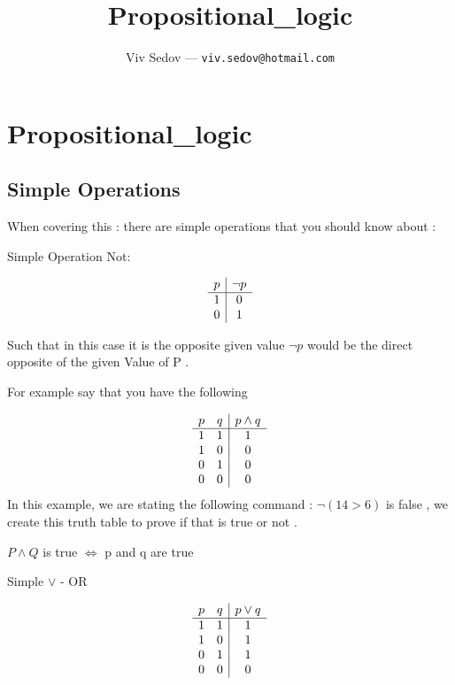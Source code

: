 \documentclass{article}
\theoremstyle{mytheoremstyle}
\theoremstyle{mytheoremstyle}
\theoremstyle{myproblemstyle}
\begin{document}
\title{
	Propositional_logic
}
\author{
	Viv Sedov --- \texttt{viv.sedov@hotmail.com}
}
\maketitle

\tableofcontents

\newpage



\section{Propositional\_logic}

\subsection{Simple Operations}
When covering this : there are simple operations that you should know about :

Simple Operation Not:

\[\begin{array}{c | c}
    p & \neg p \\
    \hline
    1 & 0 \\
    0 & 1
\end{array}
\]

Such that in this case it is the opposite given value $\neg p $ would be the direct opposite of the given Value of P .

For example say that you have the following

\[\begin{array}{c c | c}
    p & q & p \land q\\
    \hline
    1  & 1 & 1 \\
    1 & 0 & 0 \\
    0 & 1 & 0 \\
    0 & 0 & 0
\end{array}\]
In this example, we are stating the following command : $\neg(14 > 6)$ is false , we create this truth table to prove if that is true or not .

$P \land Q $ is true $\iff$ p and q are true

Simple $\lor$ - OR


\[\begin{array}{c c | c}
    p & q & p \lor q \\
    \hline
    1 & 1 & 1 \\
    1 & 0 & 1 \\
    0 & 1 & 1 \\
    0 & 0 & 0 \\
\end{array}\]
\end{document}
